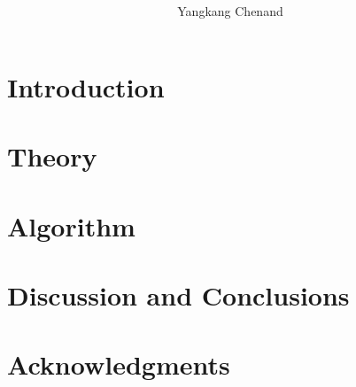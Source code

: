 \renewcommand{\thefootnote}{\fnsymbol{footnote}}

\title{ }
\author{Yangkang Chen\footnotemark[1]
and \footnotemark[2]}

\lefthead{ \& }
\righthead{}
\renewcommand{\thefootnote}{\fnsymbol{footnote}} 


\address{
\footnotemark[1]Bureau of Economic Geology, \\
John A. and Katherine G. Jackson School of Geosciences \\
The University of Texas at Austin \\
University Station, Box X \\
Austin, TX 78713-8972 \\
USA \\
chenyk1990@gmail.com \\
\footnotemark[2]
}

\maketitle
\newpage

\begin{abstract}

\end{abstract}

\section{Introduction}
 
\section{Theory}

\section{Algorithm}
 
\section{Discussion and Conclusions}

\section{Acknowledgments}



